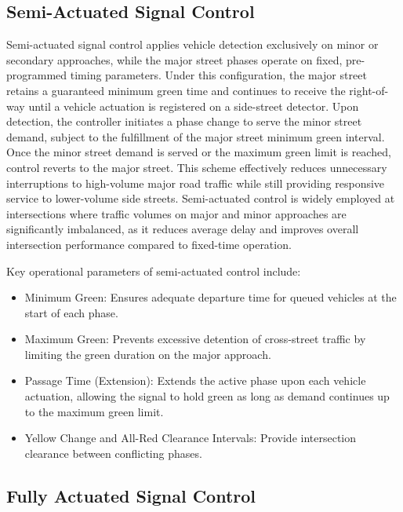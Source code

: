 \subsection{Semi-Actuated Signal Control}

Semi-actuated signal control applies vehicle detection 
exclusively on minor or secondary approaches, while the 
major street phases operate on fixed, pre-programmed timing 
parameters. Under this configuration, the major street 
retains a guaranteed minimum green time and continues to 
receive the right-of-way until a vehicle actuation is 
registered on a side-street detector. Upon detection, the 
controller initiates a phase change to serve the minor 
street demand, subject to the fulfillment of the major 
street minimum green interval. Once the minor street demand 
is served or the maximum green limit is reached, control 
reverts to the major street. This scheme effectively reduces 
unnecessary interruptions to high-volume major road traffic 
while still providing responsive service to lower-volume side 
streets. Semi-actuated control is widely employed at 
intersections where traffic volumes on major and minor 
approaches are significantly imbalanced, as it reduces 
average delay and improves overall intersection performance 
compared to fixed-time operation.

Key operational parameters of semi-actuated control include:

\begin{itemize}
    \item Minimum Green: Ensures adequate departure time for 
    queued vehicles at the start of each phase.

    \item Maximum Green: Prevents excessive detention of 
    cross-street traffic by limiting the green duration on 
    the major approach.

    \item Passage Time (Extension): Extends the active phase 
    upon each vehicle actuation, allowing the signal to hold 
    green as long as demand continues up to the maximum green 
    limit.

    \item Yellow Change and All-Red Clearance Intervals: 
    Provide intersection clearance between conflicting phases.

\end{itemize}


\subsection{Fully Actuated Signal Control}


